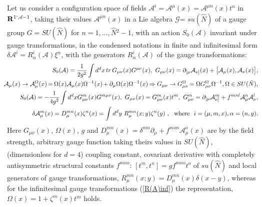 \documentclass[10pt]{article}
\begin{document}
\label{GenSUSY}
Let us consider a configuration space of fields $\mathcal{A}^i = \mathcal{A}^{\mu}(x)=\mathcal{A}^{\mu n}(x)t^n$
in $\mathbf{R}^{1`,d-1}$, taking their values $\mathcal{A}^{\mu n}(x)$ in a Lie algebra
$\mathcal{G}$= $su(\hat{N})$ of a gauge group $G= SU(\hat{N})$ for $n=1,...,\hat{N}{}^2-1$,
with an action $S_0(\mathcal{A})$ invariant under gauge transformations, in the condensed notations
in finite  and infinitesimal form $\delta \mathcal{A}^i = R^i_\alpha(\mathcal{A})\xi^\alpha$, with the generators
$R^i_\alpha(\mathcal{A})$ of the gauge transformations:
\begin{eqnarray}
\hspace{-0.7em} &\hspace{-0.9em}&\ S_{0}(\mathcal{A}) = \frac{1}{2g^2}\int d^{d}x\, tr\, G_{\mu \nu }(x)G^{\mu \nu  }(x) ,
\  G_{\mu \nu }(x)=   \partial _{[
\mu }\mathcal{A}_{\nu ]}(x)   + \big[\mathcal{A}_{\mu }(x),\mathcal{A}_{\nu }(x)\big],  \label{variat} \\
\hspace{-0.7em} &\hspace{-0.9em}&
\mathcal{A}_{\mu }(x) \to \mathcal{A}^\Omega_{\mu }(x)\hspace{-0.1em} = \hspace{-0.1em}\Omega(x) \mathcal{A}_{\mu }(x) \Omega^{-1}(x)\hspace{-0.1em} +  \partial_\mu\Omega(x)\Omega^{-1}(x) \hspace{-0.1em}\Rightarrow   G_{\mu \nu }\to G^\Omega_{\mu \nu }\hspace{-0.1em} =  \Omega G_{\mu \nu }^\Omega  \Omega^{-1}  ,  \Omega \in SU(\hat{N}),
\label{R(A)}\\
\hspace{-0.7em} &\hspace{-0.9em}&\ S_{0}(\mathcal{A})= -\frac{1}{4g^2}\int d^{d}x G_{\mu \nu }^{m}(x)G^{m\mu \nu }(x),
\ G_{\mu \nu }(x) =  G_{\mu \nu }^{m}(x)t^m,  \ G_{\mu \nu }^{m} =\partial _{[\mu }\mathcal{A}_{\nu ]}^{m}+f^{mnl}\mathcal{A}_{\mu }^{n}\mathcal{A}_{\nu }^{l},  \label{variatinf} \\
\hspace{-0.7em} &\hspace{-0.9em}&
\delta \mathcal{A}_{\mu }^{m}(x)=D_{\mu }^{mn}(x)\zeta ^{n}(x)=\int d^{d}y\ R_{\mu
}^{mn}(x;y)\zeta ^{n}(y)\ ,\ \ \mathrm{where}\ \ i=(\mu ,m,x),\alpha =(n,y).
 \label{R(A)inf}
\end{eqnarray}%
Here  $G_{\mu \nu }(x)$, $\Omega(x)$, $g$ and  $D_{\mu }^{mn}(x) = \delta^{mn}\partial_\mu+f^{mon}\mathcal{A}_\mu^o(x)$ are  by the field strength, arbitrary gauge function taking theirs values in  $SU(\hat{N})$, (dimensionless for $d=4$) coupling constant,   covariant derivative with completely antisymmetric structural constants $f^{mno}$: $[t^m,t^n]=gf^{mno}t^o$ of $su(\hat{N})$ and local generators of gauge transformations, $R_{\mu
}^{mn}(x;y) = D_{\mu }^{mn}(x)\delta(x-y)$,  whereas for the infinitesimal gauge transformations (\ref{R(A)inf}) the representation, $\Omega(x) = 1+\zeta ^{m}(x)t^m$ holds.
\end{document}

